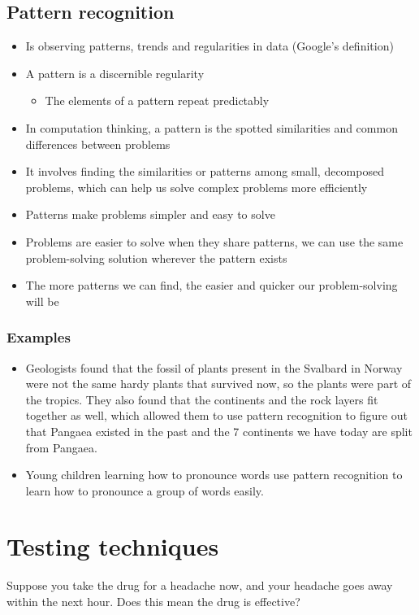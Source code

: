 \documentclass[11pt]{article}
\begin{document}
\clearpage
\subsection{Pattern recognition}
\label{sec:org3020850}
\begin{itemize}
\item Is observing patterns, trends and regularities in data (Google's definition)
\item A pattern is a discernible regularity
\begin{itemize}
\item The elements of a pattern repeat predictably
\end{itemize}
\item In computation thinking, a pattern is the spotted similarities and common differences between problems
\item It involves finding the similarities or patterns among small, decomposed problems, which can help us solve complex problems more efficiently
\item Patterns make problems simpler and easy to solve
\item Problems are easier to solve when they share patterns, we can use the same problem-solving solution wherever the pattern exists
\item The more patterns we can find, the easier and quicker our problem-solving will be
\end{itemize}
\subsubsection{Examples}
\label{sec:org6baaaae}
\begin{itemize}
\item Geologists found that the fossil of plants present in the Svalbard in Norway were not the same hardy plants that survived now, so the plants were part of the tropics. They also found that the continents and the rock layers fit together as well, which allowed them to use pattern recognition to figure out that Pangaea existed in the past and the 7 continents we have today are split from Pangaea.
\item Young children learning how to pronounce words use pattern recognition to learn how to pronounce a group of words easily.
\end{itemize}
\section{Testing techniques}
\label{sec:orge5a907e}
Suppose you take the drug for a headache now, and your headache goes away within the next hour. Does this mean the drug is effective?
\end{document}
